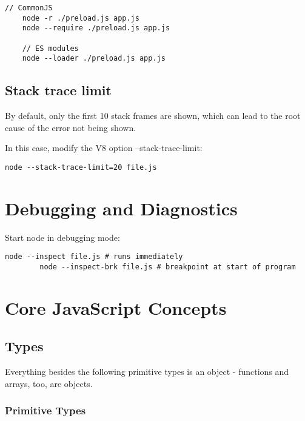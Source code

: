 \documentclass{scrartcl}
\begin{document}
    \begin{lstlisting}[style=myBash]
    // CommonJS
    node -r ./preload.js app.js
    node --require ./preload.js app.js

    // ES modules
    node --loader ./preload.js app.js
    \end{lstlisting}


\subsection{Stack trace limit}

    By default, only the first 10 stack frames are shown, which can lead to the root cause of the error not being shown.

    In this case, modify the V8 option --stack-trace-limit:

    \begin{lstlisting}[style=myBash]
    node --stack-trace-limit=20 file.js
    \end{lstlisting}

\section{Debugging and Diagnostics}

    Start node in debugging mode:

    \begin{lstlisting}[style=myBash]
        node --inspect file.js # runs immediately
        node --inspect-brk file.js # breakpoint at start of program
    \end{lstlisting}

\section{Core JavaScript Concepts}
\subsection{Types}

    Everything besides the following primitive types is an object - functions and arrays, too, are objects.

\subsubsection{Primitive Types}
\end{document}
